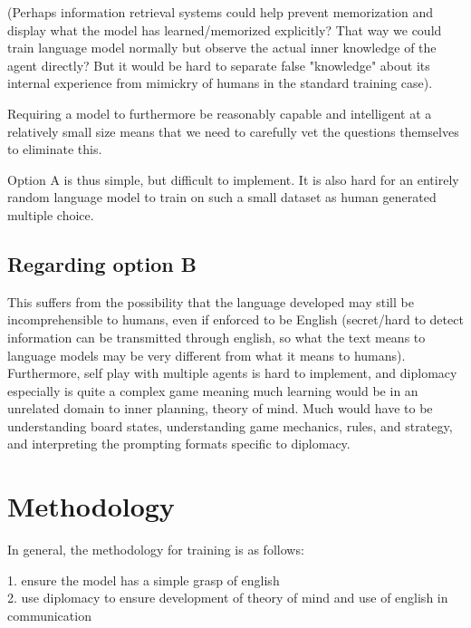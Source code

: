 \documentclass{article}
\begin{document}
(Perhaps information retrieval systems could help prevent memorization and display what the model has learned/memorized explicitly? That way we could train language model normally but observe the actual inner knowledge of the agent directly? But it would be hard to separate false "knowledge" about its internal experience from mimickry of humans in the standard training case).

Requiring a model to furthermore be reasonably capable and intelligent at a relatively small size means that we need to carefully vet the questions themselves to eliminate this.

Option A is thus simple, but difficult to implement. It is also hard for an entirely random language model to train on such a small dataset as human generated multiple choice.

\subsection{Regarding option B}

This suffers from the possibility that the language developed may still be incomprehensible to humans, even if enforced to be English (secret/hard to detect information can be transmitted through english, so what the text means to language models may be very different from what it means to humans). Furthermore, self play with multiple agents is hard to implement, and diplomacy especially is quite a complex game meaning much learning would be in an unrelated domain to inner planning, theory of mind. Much would have to be understanding board states, understanding game mechanics, rules, and strategy, and interpreting the prompting formats specific to diplomacy.

\section{Methodology}

In general, the methodology for training is as follows:

1. ensure the model has a simple grasp of english\\

2. use diplomacy to ensure development of theory of mind and use of english in communication\\
\end{document}
